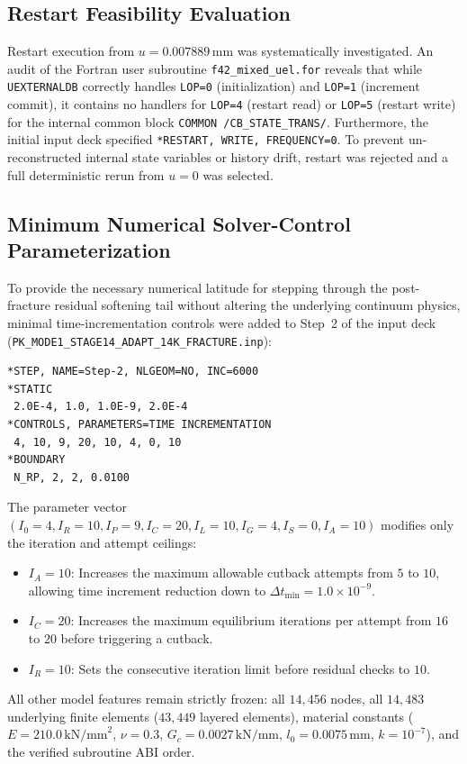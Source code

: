 \subsection{Restart Feasibility Evaluation}
\label{subsec:stage14u_restart_eval}

Restart execution from $u = 0.007889\,\mathrm{mm}$ was systematically investigated. An audit of the Fortran user subroutine \texttt{f42\_mixed\_uel.for} reveals that while \texttt{UEXTERNALDB} correctly handles \texttt{LOP=0} (initialization) and \texttt{LOP=1} (increment commit), it contains no handlers for \texttt{LOP=4} (restart read) or \texttt{LOP=5} (restart write) for the internal common block \texttt{COMMON /CB\_STATE\_TRANS/}. Furthermore, the initial input deck specified \texttt{*RESTART, WRITE, FREQUENCY=0}. To prevent un-reconstructed internal state variables or history drift, restart was rejected and a full deterministic rerun from $u = 0$ was selected.

\subsection{Minimum Numerical Solver-Control Parameterization}
\label{subsec:stage14u_controls}

To provide the necessary numerical latitude for stepping through the post-fracture residual softening tail without altering the underlying continuum physics, minimal time-incrementation controls were added to Step~2 of the input deck (\texttt{PK\_MODE1\_STAGE14\_ADAPT\_14K\_FRACTURE.inp}):
\begin{verbatim}
*STEP, NAME=Step-2, NLGEOM=NO, INC=6000
*STATIC
 2.0E-4, 1.0, 1.0E-9, 2.0E-4
*CONTROLS, PARAMETERS=TIME INCREMENTATION
 4, 10, 9, 20, 10, 4, 0, 10
*BOUNDARY
 N_RP, 2, 2, 0.0100
\end{verbatim}
The parameter vector $(I_0=4, I_R=10, I_P=9, I_C=20, I_L=10, I_G=4, I_S=0, I_A=10)$ modifies only the iteration and attempt ceilings:
\begin{itemize}
    \item $I_A = 10$: Increases the maximum allowable cutback attempts from $5$ to $10$, allowing time increment reduction down to $\Delta t_{\min} = 1.0\times 10^{-9}$.
    \item $I_C = 20$: Increases the maximum equilibrium iterations per attempt from $16$ to $20$ before triggering a cutback.
    \item $I_R = 10$: Sets the consecutive iteration limit before residual checks to $10$.
\end{itemize}
All other model features remain strictly frozen: all $14{,}456$ nodes, all $14{,}483$ underlying finite elements ($43{,}449$ layered elements), material constants ($E = 210.0\,\mathrm{kN/mm}^2$, $\nu = 0.3$, $G_c = 0.0027\,\mathrm{kN/mm}$, $l_0 = 0.0075\,\mathrm{mm}$, $k = 10^{-7}$), and the verified subroutine ABI order.

